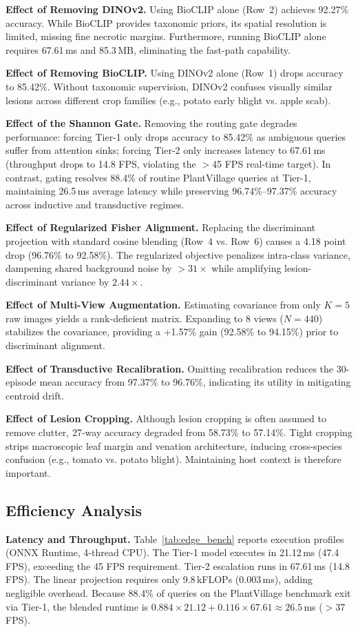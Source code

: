 \documentclass[conference]{IEEEtran}
\begin{document}
\textbf{Effect of Removing DINOv2.} Using BioCLIP alone (Row~2) achieves 92.27\% accuracy. While BioCLIP provides taxonomic priors, its spatial resolution is limited, missing fine necrotic margins. Furthermore, running BioCLIP alone requires 67.61\,ms and 85.3\,MB, eliminating the fast-path capability.

\textbf{Effect of Removing BioCLIP.} Using DINOv2 alone (Row~1) drops accuracy to 85.42\%. Without taxonomic supervision, DINOv2 confuses visually similar lesions across different crop families (e.g., potato early blight vs. apple scab).

\textbf{Effect of the Shannon Gate.} Removing the routing gate degrades performance: forcing Tier-1 only drops accuracy to 85.42\% as ambiguous queries suffer from attention sinks; forcing Tier-2 only increases latency to 67.61\,ms (throughput drops to 14.8 FPS, violating the $>$45 FPS real-time target). In contrast, gating resolves 88.4\% of routine PlantVillage queries at Tier-1, maintaining 26.5\,ms average latency while preserving 96.74\%--97.37\% accuracy across inductive and transductive regimes.

\textbf{Effect of Regularized Fisher Alignment.} Replacing the discriminant projection with standard cosine blending (Row~4 vs. Row~6) causes a 4.18 point drop (96.76\% to 92.58\%). The regularized objective penalizes intra-class variance, dampening shared background noise by $>31\times$ while amplifying lesion-discriminant variance by $2.44\times$.

\textbf{Effect of Multi-View Augmentation.} Estimating covariance from only $K=5$ raw images yields a rank-deficient matrix. Expanding to 8 views ($N=440$) stabilizes the covariance, providing a +1.57\% gain (92.58\% to 94.15\%) prior to discriminant alignment.

\textbf{Effect of Transductive Recalibration.} Omitting recalibration reduces the 30-episode mean accuracy from 97.37\% to 96.76\%, indicating its utility in mitigating centroid drift.

\textbf{Effect of Lesion Cropping.} Although lesion cropping is often assumed to remove clutter, 27-way accuracy degraded from 58.73\% to 57.14\%. Tight cropping strips macroscopic leaf margin and venation architecture, inducing cross-species confusion (e.g., tomato vs. potato blight). Maintaining host context is therefore important.

\subsection{Efficiency Analysis}
\label{sec:efficiency_analysis}
\textbf{Latency and Throughput.} Table~\ref{tab:edge_bench} reports execution profiles (ONNX Runtime, 4-thread CPU). The Tier-1 model executes in 21.12\,ms (47.4 FPS), exceeding the 45 FPS requirement. Tier-2 escalation runs in 67.61\,ms (14.8 FPS). The linear projection requires only 9.8\,kFLOPs (0.003\,ms), adding negligible overhead. Because 88.4\% of queries on the PlantVillage benchmark exit via Tier-1, the blended runtime is $0.884 \times 21.12 + 0.116 \times 67.61 \approx 26.5$\,ms ($>$37 FPS).
\end{document}
